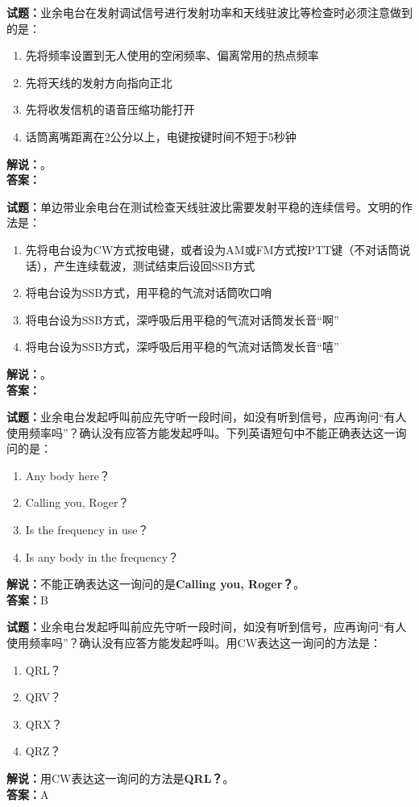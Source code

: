 \documentclass{ctexbook}
\begin{document}
\bigskip

\noindent\textbf{试题：}业余电台在发射调试信号进行发射功率和天线驻波比等检查时必须注意做到的是：
\begin{enumerate}[leftmargin=3em]
  \item 先将频率设置到无人使用的空闲频率、偏离常用的热点频率
  \item 先将天线的发射方向指向正北
  \item 先将收发信机的语音压缩功能打开
  \item 话筒离嘴距离在2公分以上，电键按键时间不短于5秒钟
\end{enumerate}
\noindent\textbf{解说：}\textbf{}。\\\noindent\textbf{答案：}

\bigskip

\noindent\textbf{试题：}单边带业余电台在测试检查天线驻波比需要发射平稳的连续信号。文明的作法是：
\begin{enumerate}[leftmargin=3em]
  \item 先将电台设为CW方式按电键，或者设为AM或FM方式按PTT键（不对话筒说话），产生连续载波，测试结束后设回SSB方式
  \item 将电台设为SSB方式，用平稳的气流对话筒吹口哨
  \item 将电台设为SSB方式，深呼吸后用平稳的气流对话筒发长音“啊”
  \item 将电台设为SSB方式，深呼吸后用平稳的气流对话筒发长音“嘻”
\end{enumerate}
\noindent\textbf{解说：}\textbf{}。\\\noindent\textbf{答案：}

\bigskip

\noindent\textbf{试题：}业余电台发起呼叫前应先守听一段时间，如没有听到信号，应再询问“有人使用频率吗”？确认没有应答方能发起呼叫。下列英语短句中不能正确表达这一询问的是：
\begin{enumerate}[leftmargin=3em]
  \item Any body here？
  \item Calling you, Roger？
  \item Is the frequency in use？
  \item Is any body in the frequency？
\end{enumerate}
\noindent\textbf{解说：}不能正确表达这一询问的是\textbf{Calling you, Roger？}。\\\noindent\textbf{答案：}B

\bigskip

\noindent\textbf{试题：}业余电台发起呼叫前应先守听一段时间，如没有听到信号，应再询问“有人使用频率吗”？确认没有应答方能发起呼叫。用CW表达这一询问的方法是：
\begin{enumerate}[leftmargin=3em]
  \item QRL？
  \item QRV？
  \item QRX？
  \item QRZ？
\end{enumerate}
\noindent\textbf{解说：}用CW表达这一询问的方法是\textbf{QRL？}。\\\noindent\textbf{答案：}A
\end{document}
